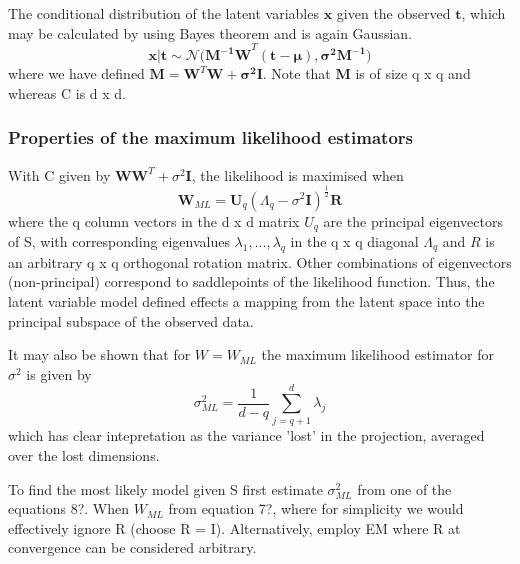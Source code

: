 \documentclass[ %
                    author={Dillon Keith Diep},
                supervisor={Dr. Carl Henrik Ek},
                    degree={MEng},
                     title={Assisted Content Generation for 3D Hair Geometry},
                  subtitle={[INCOMPLETE DRAFT, CONTAINS NOTES FROM RESEARCH]},
                      type={Research},
                      year={2014} ]{dissertation}
\begin{document}
The conditional distribution of the latent variables $\mathbf{x}$ given the observed $\mathbf{t}$, which may be calculated by using Bayes theorem and is again Gaussian.
\begin{equation}
	\mathbf{x|t\sim\mathcal{N}(M^{-1}W}^T\mathbf{(t-\mu),\sigma^2M^{-1})}
\end{equation}
where we have defined $\mathbf{M=W}^T\mathbf{W+\sigma^2I}$.
Note that $\mathbf{M}$ is of size q x q and whereas C is d x d.

\subsubsection{Properties of the maximum likelihood estimators}
With C given by  $\mathbf{WW}^T+\sigma^2\mathbf{I}$, the likelihood is maximised when
\begin{equation}
	\mathbf{W}_{ML}=\mathbf{U}_q(\Lambda	_q-\sigma^2\mathbf{I})^\frac{1}{2}\mathbf{R}
\end{equation}
where the q column vectors in the d x d matrix $U_q$ are the principal eigenvectors of S, with corresponding eigenvalues $\lambda_1,...,\lambda_q$ in the q x q diagonal $\Lambda_q$ and $R$ is an arbitrary q x q orthogonal rotation matrix. Other combinations of eigenvectors (non-principal) correspond to saddlepoints of the likelihood function. Thus, the latent variable model defined effects a mapping from the latent space into the principal subspace of the observed data.

It may also be shown that for $W=W_{ML}$ the maximum likelihood estimator for $\sigma^2$ is given by
\begin{equation}
	\sigma^2_{ML}=\frac{1}{d-q}\sum^d_{j=q+1}\lambda_j
\end{equation}
which has clear intepretation as the variance 'lost' in the projection, averaged over the lost dimensions.

To find the most likely model given S first estimate $\sigma^2_{ML}$ from one of the equations 8?. When $W_{ML}$ from equation 7?, where for simplicity we would effectively ignore R (choose R = I). Alternatively, employ EM where R at convergence can be considered arbitrary.
\end{document}
